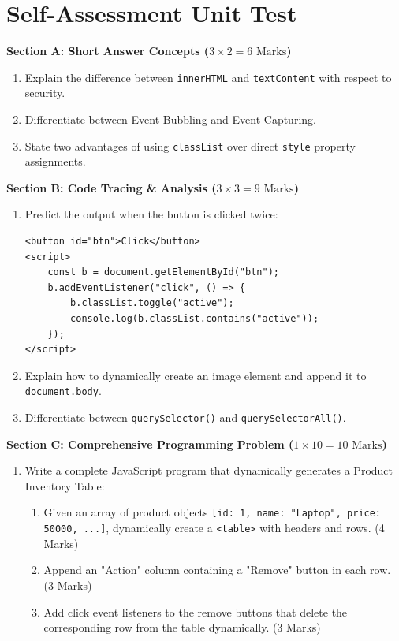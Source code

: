 \section{Self-Assessment Unit Test}

\begin{chaptertest}
\noindent\textbf{Section A: Short Answer Concepts ($3 \times 2 = 6\text{ Marks}$)}
\begin{enumerate}
    \item Explain the difference between \texttt{innerHTML} and \texttt{textContent} with respect to security.
    \item Differentiate between Event Bubbling and Event Capturing.
    \item State two advantages of using \texttt{classList} over direct \texttt{style} property assignments.
\end{enumerate}

\medskip
\noindent\textbf{Section B: Code Tracing \& Analysis ($3 \times 3 = 9\text{ Marks}$)}
\begin{enumerate}[start=4]
    \item Predict the output when the button is clicked twice:
    \begin{lstlisting}[language=HTML5]
<button id="btn">Click</button>
<script>
    const b = document.getElementById("btn");
    b.addEventListener("click", () => {
        b.classList.toggle("active");
        console.log(b.classList.contains("active"));
    });
</script>
    \end{lstlisting}
    \item Explain how to dynamically create an image element and append it to \texttt{document.body}.
    \item Differentiate between \texttt{querySelector()} and \texttt{querySelectorAll()}.
\end{enumerate}

\medskip
\noindent\textbf{Section C: Comprehensive Programming Problem ($1 \times 10 = 10\text{ Marks}$)}
\begin{enumerate}[start=7]
    \item Write a complete JavaScript program that dynamically generates a Product Inventory Table:
    \begin{enumerate}[label=(\alph*)]
        \item Given an array of product objects \texttt{[{id: 1, name: "Laptop", price: 50000}, ...]}, dynamically create a \texttt{<table>} with headers and rows. (4 Marks)
        \item Append an "Action" column containing a "Remove" button in each row. (3 Marks)
        \item Add click event listeners to the remove buttons that delete the corresponding row from the table dynamically. (3 Marks)
    \end{enumerate}
\end{enumerate}
\end{chaptertest}

